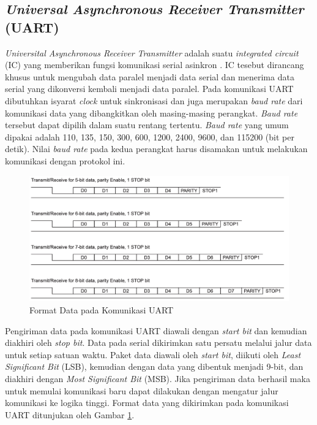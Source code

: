 \subsection{\textit{Universal Asynchronous Receiver Transmitter} (UART)}
\textit{Universital Asynchronous Receiver Transmitter} adalah suatu \textit{integrated circuit} (IC) yang memberikan fungsi komunikasi serial asinkron \cite{ti2010}. IC tesebut dirancang khusus untuk mengubah data paralel menjadi data serial dan menerima data serial yang dikonversi kembali menjadi data paralel. Pada komunikasi UART dibutuhkan isyarat \textit{clock} untuk sinkronisasi dan juga merupakan \textit{baud rate} dari komunikasi data yang dibangkitkan oleh masing-masing perangkat. \textit{Baud rate} tersebut dapat dipilih dalam suatu rentang tertentu. \textit{Baud rate} yang umum dipakai adalah 110, 135, 150, 300, 600, 1200, 2400, 9600, dan 115200 (bit per detik). Nilai \textit{baud rate} pada kedua perangkat harus disamakan untuk melakukan komunikasi dengan protokol ini.

\begin{figure}[H]
	\centering
	\includegraphics[width=12cm]{contents/chapter-2/uart-format.png}
	\caption{Format Data pada Komunikasi UART \cite{ti2010}}
	\label{Fig: uart-format}
\end{figure}

 Pengiriman data pada komunikasi UART diawali dengan \textit{start bit} dan kemudian diakhiri oleh \textit{stop bit}. Data pada serial dikirimkan satu persatu melalui jalur data untuk setiap satuan waktu. Paket data diawali oleh \textit{start bit}, diikuti oleh \textit{Least Significant Bit} (LSB), kemudian dengan data yang dibentuk menjadi 9-bit, dan diakhiri dengan \textit{Most Significant Bit} (MSB). Jika pengiriman data berhasil maka untuk memulai komunikasi baru dapat dilakukan dengan mengatur jalur komunikasi ke logika tinggi. Format data yang dikirimkan pada komunikasi UART ditunjukan oleh Gambar \ref{Fig: uart-format}.

